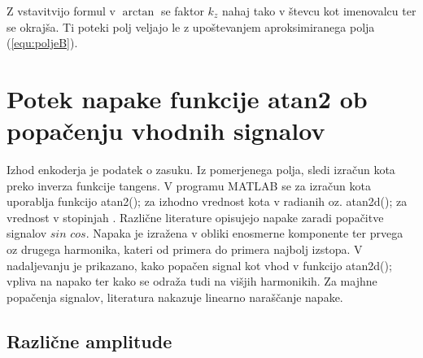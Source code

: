 Z vstavitvijo formul v $\arctan$ se faktor $k_z$ nahaj tako v števcu kot imenovalcu ter se okrajša. Ti poteki polj veljajo le z upoštevanjem aproksimiranega polja (\ref{equ:poljeB}).



\chapter{Potek napake funkcije atan2 ob popačenju vhodnih signalov}
Izhod enkoderja je podatek o zasuku. Iz pomerjenega polja, sledi izračun kota preko inverza funkcije tangens.
V programu MATLAB se za izračun kota uporablja funkcijo atan2(); za izhodno vrednost kota v radianih oz. atan2d(); za vrednost v stopinjah \cite{atan2Matlab}\cite{atan2dMatlab}. Različne literature \cite{RLS3} \cite{osnova} \cite{RLS1} \cite{RLS2} opisujejo napake zaradi popačitve signalov $sin$ $cos$. Napaka je izražena v obliki enosmerne komponente ter prvega oz drugega harmonika, kateri od primera do primera najbolj izstopa. V nadaljevanju je prikazano, kako popačen signal kot vhod v funkcijo atan2d(); vpliva na napako ter kako se odraža tudi na višjih harmonikih. Za majhne popačenja signalov, literatura nakazuje linearno naraščanje napake.




\section{Različne amplitude}

